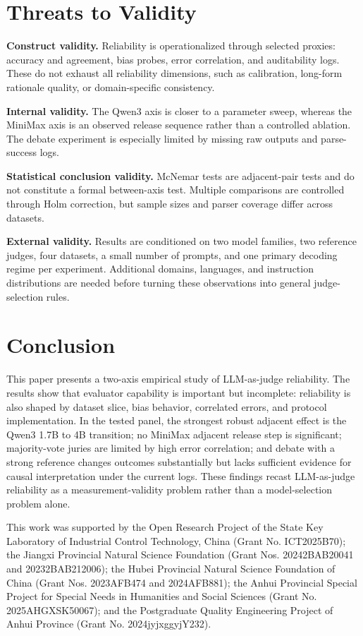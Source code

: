 \documentclass[sigconf,nonacm]{acmart}
\begin{document}
\section{Threats to Validity}

\textbf{Construct validity.} Reliability is operationalized through selected proxies: accuracy and agreement, bias probes, error correlation, and auditability logs. These do not exhaust all reliability dimensions, such as calibration, long-form rationale quality, or domain-specific consistency.

\textbf{Internal validity.} The Qwen3 axis is closer to a parameter sweep, whereas the MiniMax axis is an observed release sequence rather than a controlled ablation. The debate experiment is especially limited by missing raw outputs and parse-success logs.

\textbf{Statistical conclusion validity.} McNemar tests are adjacent-pair tests and do not constitute a formal between-axis test. Multiple comparisons are controlled through Holm correction, but sample sizes and parser coverage differ across datasets.

\textbf{External validity.} Results are conditioned on two model families, two reference judges, four datasets, a small number of prompts, and one primary decoding regime per experiment. Additional domains, languages, and instruction distributions are needed before turning these observations into general judge-selection rules.

\section{Conclusion}

This paper presents a two-axis empirical study of LLM-as-judge reliability. The results show that evaluator capability is important but incomplete: reliability is also shaped by dataset slice, bias behavior, correlated errors, and protocol implementation. In the tested panel, the strongest robust adjacent effect is the Qwen3 1.7B to 4B transition; no MiniMax adjacent release step is significant; majority-vote juries are limited by high error correlation; and debate with a strong reference changes outcomes substantially but lacks sufficient evidence for causal interpretation under the current logs. These findings recast LLM-as-judge reliability as a measurement-validity problem rather than a model-selection problem alone.

\begin{acks}
This work was supported by the Open Research Project of the State Key Laboratory of Industrial Control Technology, China (Grant No. ICT2025B70); the Jiangxi Provincial Natural Science Foundation (Grant Nos. 20242BAB20041 and 20232BAB212006); the Hubei Provincial Natural Science Foundation of China (Grant Nos. 2023AFB474 and 2024AFB881); the Anhui Provincial Special Project for Special Needs in Humanities and Social Sciences (Grant No. 2025AHGXSK50067); and the Postgraduate Quality Engineering Project of Anhui Province (Grant No. 2024jyjxggyjY232).
\end{acks}



\end{document}
